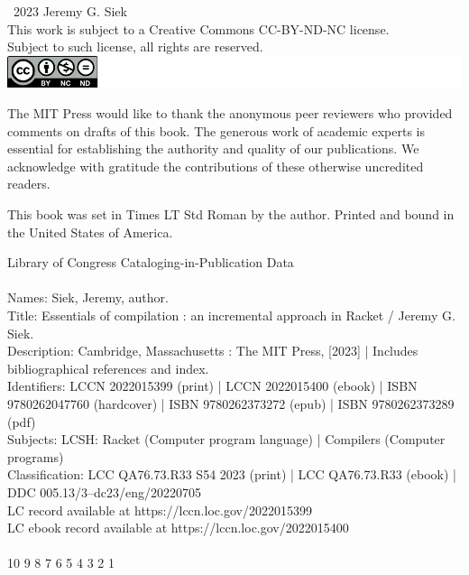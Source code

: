 \documentclass[7x10]{TimesAPriori_MIT}%
\numberwithin{theorem}{chapter}
\numberwithin{definition}{chapter}
\numberwithin{equation}{chapter}
\begin{document}
\begin{copyrightpage}
  \textcopyright\ 2023 Jeremy G. Siek \\[2ex]
  This work is subject to a Creative Commons CC-BY-ND-NC license. \\[2ex]
  Subject to such license, all rights are reserved. \\[2ex]
  \includegraphics{CCBY-logo}

The MIT Press would like to thank the anonymous peer reviewers who
provided comments on drafts of this book. The generous work of
academic experts is essential for establishing the authority and
quality of our publications. We acknowledge with gratitude the
contributions of these otherwise uncredited readers.

This book was set in Times LT Std Roman by the author. Printed and
bound in the United States of America.

Library of Congress Cataloging-in-Publication Data\\
\ \\
Names: Siek, Jeremy, author.  \\
Title: Essentials of compilation : an incremental approach in Racket / Jeremy G. Siek.  \\
Description: Cambridge, Massachusetts : The MIT Press, [2023] | Includes bibliographical references and index. \\
Identifiers: LCCN 2022015399 (print) | LCCN 2022015400 (ebook) | ISBN 9780262047760 (hardcover) | ISBN 9780262373272 (epub) | ISBN 9780262373289 (pdf)  \\
Subjects: LCSH: Racket (Computer program language) | Compilers (Computer programs) \\
Classification: LCC QA76.73.R33 S54 2023  (print) | LCC QA76.73.R33 (ebook) | DDC 005.13/3--dc23/eng/20220705 \\
LC record available at https://lccn.loc.gov/2022015399\\
LC ebook record available at https://lccn.loc.gov/2022015400\\
\ \\

10 9 8 7 6 5 4 3 2 1

  

\end{copyrightpage}
\end{document}
